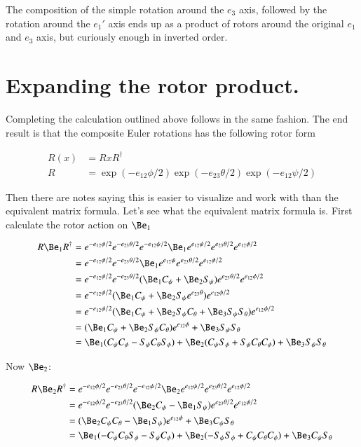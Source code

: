 \documentclass{article}
\begin{document}
The composition of the simple rotation around the $e_3$ axis, followed by the rotation around the $e_1'$ axis ends up
as a product of rotors around the original $e_1$ and $e_3$ axis, but curiously enough in inverted order.

\section{ Expanding the rotor product. }

Completing the calculation outlined above follows in the same fashion.  The 
end result is that the composite Euler rotations has the following rotor form

\begin{align*}
R(x) &= R x R^\dagger \\
R &= \exp(-e_{12}\phi/2) \exp(-e_{23}\theta/2) \exp(-e_{12}\psi/2)
\end{align*}

Then there are notes saying this is easier to visualize and work with than
the equivalent matrix formula.  Let's see what the equivalent matrix formula
is.  First calculate the rotor action on $\Be_1$

\begin{align*}
R \Be_1 R^\dagger
&= 
e^{-e_{12}\phi/2} e^{-e_{23}\theta/2} e^{-e_{12}\psi/2}
\Be_1
e^{e_{12}\psi/2}
e^{e_{23}\theta/2} 
e^{e_{12}\phi/2} \\
&= 
e^{-e_{12}\phi/2} e^{-e_{23}\theta/2} 
\Be_1 e^{e_{12}\psi}
e^{e_{23}\theta/2} 
e^{e_{12}\phi/2} \\
&= 
e^{-e_{12}\phi/2} e^{-e_{23}\theta/2} 
(\Be_1 C_\psi + \Be_2 S_\psi)
e^{e_{23}\theta/2} 
e^{e_{12}\phi/2} \\
&= 
e^{-e_{12}\phi/2} 
(\Be_1 C_\psi + \Be_2 S_\psi e^{e_{23}\theta} )
e^{e_{12}\phi/2} \\
&= 
e^{-e_{12}\phi/2} 
(\Be_1 C_\psi + \Be_2 S_\psi C_\theta + \Be_3 S_\psi S_\theta )
e^{e_{12}\phi/2} \\
&= 
(\Be_1 C_\psi + \Be_2 S_\psi C_\theta ) e^{e_{12}\phi} 
+ \Be_3 S_\psi S_\theta  \\
&= 
  \Be_1 (C_\psi C_\phi - S_\psi C_\theta S_\phi)
+ \Be_2 (C_\psi S_\phi + S_\psi C_\theta C_\phi)
+ \Be_3 S_\psi S_\theta  \\
\end{align*}

Now $\Be_2$:

\begin{align*}
R \Be_2 R^\dagger
&= 
e^{-e_{12}\phi/2} e^{-e_{23}\theta/2} e^{-e_{12}\psi/2}
\Be_2
e^{e_{12}\psi/2}
e^{e_{23}\theta/2} 
e^{e_{12}\phi/2} \\
&= 
e^{-e_{12}\phi/2} e^{-e_{23}\theta/2} 
(\Be_2 C_\psi - \Be_1 S_\psi)
e^{e_{23}\theta/2} 
e^{e_{12}\phi/2} \\
&= 
(\Be_2 C_\psi C_\theta
- \Be_1 S_\psi)
e^{e_{12}\phi} 
+\Be_3 C_\psi S_\theta \\
&= 
\Be_1 (-C_\psi C_\theta S_\phi - S_\psi C_\phi)
+ \Be_2 (-S_\psi S_\phi + C_\psi C_\theta C_\phi)
+ \Be_3 C_\psi S_\theta \\
\end{align*}
\end{document}
